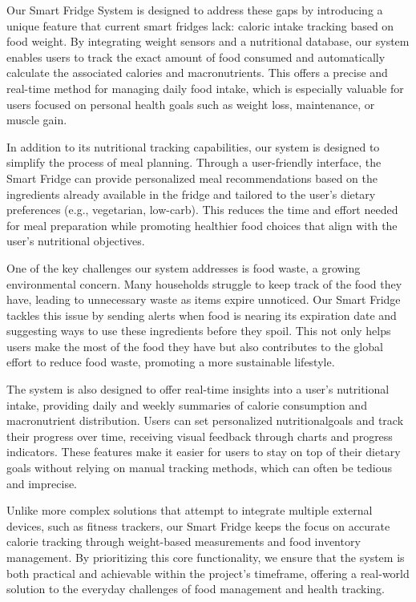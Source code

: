 \documentclass[conference]{IEEEtran}
\begin{document}
Our Smart Fridge System is designed to address these gaps by introducing a unique feature that current smart fridges lack: caloric intake tracking based on food weight. By integrating weight sensors and a nutritional database, our system enables users to track the exact amount of food consumed and automatically calculate the associated calories and macronutrients. This offers a precise and real-time method for managing daily food intake, which is especially valuable for users focused on personal health goals such as weight loss, maintenance, or muscle gain.

In addition to its nutritional tracking capabilities, our system is designed to simplify the process of meal planning. Through a user-friendly interface, the Smart Fridge can provide personalized meal recommendations based on the ingredients already available in the fridge and tailored to the user’s dietary preferences (e.g., vegetarian, low-carb). This reduces the time and effort needed for meal preparation while promoting healthier food choices that align with the user’s nutritional objectives.

One of the key challenges our system addresses is food waste, a growing environmental concern. Many households struggle to keep track of the food they have, leading to unnecessary waste as items expire unnoticed. Our Smart Fridge tackles this issue by sending alerts when food is nearing its expiration date and suggesting ways to use these ingredients before they spoil. This not only helps users make the most of the food they have but also contributes to the global effort to reduce food waste, promoting a more sustainable lifestyle.

The system is also designed to offer real-time insights into a user’s nutritional intake, providing daily and weekly summaries of calorie consumption and macronutrient distribution. Users can set personalized nutritionalgoals and track their progress over time, receiving visual feedback through charts and progress indicators. These features make it easier for users to stay on top of their dietary goals without relying on manual tracking methods, which can often be tedious and imprecise.

Unlike more complex solutions that attempt to integrate multiple external devices, such as fitness trackers, our Smart Fridge keeps the focus on accurate calorie tracking through weight-based measurements and food inventory management. By prioritizing this core functionality, we ensure that the system is both practical and achievable within the project’s timeframe, offering a real-world solution to the everyday challenges of food management and health tracking.
\end{document}
